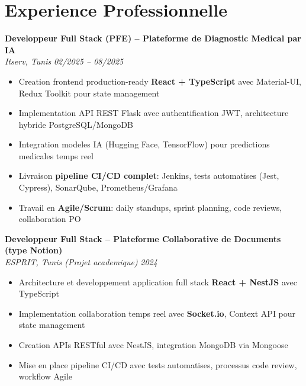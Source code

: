 \documentclass[10pt,a4paper]{article}
\begin{document}
\vspace{5pt}

\section*{Experience Professionnelle}
\vspace{2pt}

{\small

\textbf{Developpeur Full Stack (PFE) -- Plateforme de Diagnostic Medical par IA}\\[1pt]
\textit{Itserv, Tunis} \hfill \textit{02/2025 -- 08/2025}
\begin{itemize}[leftmargin=12pt,itemsep=2pt,topsep=3pt,parsep=0pt]
  \item Creation frontend production-ready \textbf{React + TypeScript} avec Material-UI, Redux Toolkit pour state management
  \item Implementation API REST Flask avec authentification JWT, architecture hybride PostgreSQL/MongoDB
  \item Integration modeles IA (Hugging Face, TensorFlow) pour predictions medicales temps reel
  \item Livraison \textbf{pipeline CI/CD complet}: Jenkins, tests automatises (Jest, Cypress), SonarQube, Prometheus/Grafana
  \item Travail en \textbf{Agile/Scrum}: daily standups, sprint planning, code reviews, collaboration PO
\end{itemize}

\vspace{3pt}
\textbf{Developpeur Full Stack -- Plateforme Collaborative de Documents (type Notion)}\\[1pt]
\textit{ESPRIT, Tunis (Projet academique)} \hfill \textit{2024}
\begin{itemize}[leftmargin=12pt,itemsep=2pt,topsep=3pt,parsep=0pt]
  \item Architecture et developpement application full stack \textbf{React + NestJS} avec TypeScript
  \item Implementation collaboration temps reel avec \textbf{Socket.io}, Context API pour state management
  \item Creation APIs RESTful avec NestJS, integration MongoDB via Mongoose
  \item Mise en place pipeline CI/CD avec tests automatises, processus code review, workflow Agile
\end{itemize}

}
\end{document}
